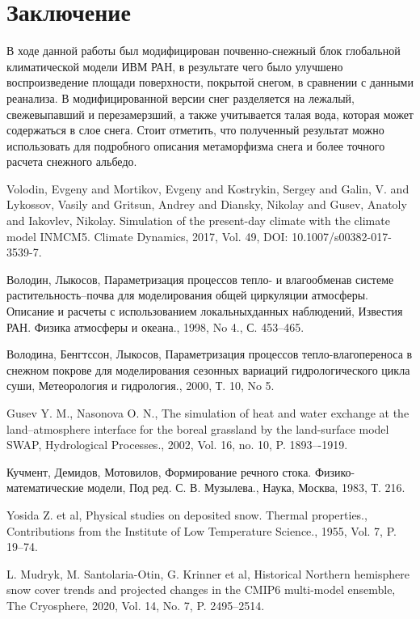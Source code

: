 \documentclass[a4paper, fontsize=12pt]{scrartcl}
\begin{document}
\section{Заключение}

В ходе данной работы был модифицирован почвенно-снежный блок глобальной климатической модели ИВМ РАН, в результате чего было улучшено воспроизведение площади поверхности, покрытой снегом, в сравнении с данными реанализа. В модифицированной версии снег разделяется на лежалый, свежевыпавший и перезамерзший, а также учитывается талая вода, которая может содержаться в слое снега. Стоит отметить,  что полученный результат можно использовать для подробного описания метаморфизма снега и более точного расчета снежного альбедо. 



\begin{thebibliography}{9}

Volodin, Evgeny and Mortikov, Evgeny and Kostrykin, Sergey and Galin, V. and Lykossov, Vasily and Gritsun, Andrey and Diansky, Nikolay and Gusev, Anatoly and Iakovlev, Nikolay. Simulation of the present-day climate with the climate model INMCM5. Climate Dynamics, 2017, Vol. 49, DOI: 10.1007/s00382-017-3539-7.

 Володин, Лыкосов,  Параметризация процессов тепло- и влагообменав системе растительность–почва для моделирования общей циркуляции атмосферы. Описание и расчеты с использованием локальныхданных наблюдений, Известия РАН. Физика атмосферы и океана., 1998, No 4., С. 453–465.

 Володина, Бенгтссон, Лыкосов, Параметризация процессов тепло-влагопереноса в снежном покрове для моделирования сезонных вариаций гидрологического цикла суши, Метеорология и гидрология., 2000, Т. 10, No 5. 

Gusev Y. M., Nasonova O. N., The simulation of heat and water exchange at the land–atmosphere interface for the boreal grassland by the land-surface model SWAP, Hydrological Processes., 2002, Vol. 16, no. 10, P. 1893–-1919.

Кучмент, Демидов, Мотовилов, Формирование речного стока. Физико-математические модели, Под ред. С. В. Музылева., Наука, Москва, 1983, Т. 216.

Yosida Z. et al, Physical studies on deposited snow. Thermal properties., Contributions from the Institute of Low Temperature Science., 1955, Vol. 7, P. 19–74.

L. Mudryk, M. Santolaria-Otin, G. Krinner et al, Historical Northern hemisphere snow cover trends and projected changes in the CMIP6  multi-model  ensemble, The Cryosphere, 2020, Vol. 14, No. 7, P. 2495–2514.

\end{thebibliography}
\end{document}
